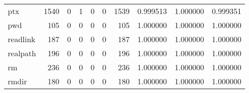 \begin{longtable}{lrrrrrrrrr}
ptx       &                                               1540 &                                                  0 &                                                  1 &                                                  0 &                                                  0 &                                               1539 &                                           0.999513 &                               1.000000 &                             0.999351 \\
pwd       &                                                105 &                                                  0 &                                                  0 &                                                  0 &                                                  0 &                                                105 &                                           1.000000 &                               1.000000 &                             1.000000 \\
readlink  &                                                187 &                                                  0 &                                                  0 &                                                  0 &                                                  0 &                                                187 &                                           1.000000 &                               1.000000 &                             1.000000 \\
realpath  &                                                196 &                                                  0 &                                                  0 &                                                  0 &                                                  0 &                                                196 &                                           1.000000 &                               1.000000 &                             1.000000 \\
rm        &                                                236 &                                                  0 &                                                  0 &                                                  0 &                                                  0 &                                                236 &                                           1.000000 &                               1.000000 &                             1.000000 \\
rmdir     &                                                180 &                                                  0 &                                                  0 &                                                  0 &                                                  0 &                                                180 &                                           1.000000 &                               1.000000 &                             1.000000 \\

\end{longtable}
